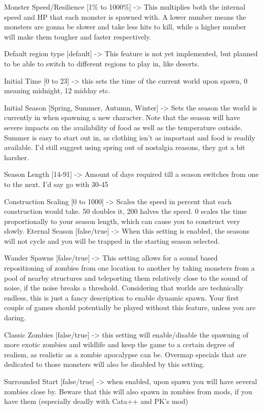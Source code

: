 \documentclass[11pt]{report}
\begin{document}
Monster Speed/Resilience [1\% to 1000\%] -> This multiplies both the internal speed and HP that each monster is spawned with. A lower number means the monsters are gonna be slower and take less hits to kill, while a higher number will make them tougher and faster respectively.

Default region type [default] -> This feature is not yet implemented, but planned to be able to switch to different regions to play in, like deserts.

Initial Time [0 to 23] -> this sets the time of the current world upon spawn, 0 meaning midnight, 12 midday etc.

Initial Season [Spring, Summer, Autumn, Winter] -> Sets the season the world is currently in when spawning a new character. Note that the season will have severe impacts on the availability of food as well as the temperature outside. Summer is easy to start out in, as clothing isn't as important and food is readily available. I'd still suggest using spring out of nostalgia reasons, they got a bit harsher.

Season Length [14-91] -> Amount of days required till a season switches from one to the next. I'd say go with 30-45

Construction Scaling [0 to 1000] -> Scales the speed in percent that each construction would take. 50 doubles it, 200 halves the speed. 0 scales the time proportionally to your season length, which can cause you to construct very slowly.
Eternal Season [false/true] -> When this setting is enabled, the seasons will not cycle and you will be trapped in the starting season selected.

Wander Spawns [false/true] -> This setting allows for a sound based repositioning of zombies from one location to another by taking monsters from a pool of nearby structures and teleporting them relatively close to the sound of noise, if the noise breaks a threshold. Considering that worlds are technically endless, this is just a fancy description to enable dynamic spawn. Your first couple of games should potentially be played without this feature, unless you are daring.

Classic Zombies [false/true] -> this setting will enable/disable the spawning of more exotic zombies and wildlife and keep the game to a certain degree of realism, as realistic as a zombie apocalypse can be. Overmap specials that are dedicated to those monsters will also be disabled by this setting.

Surrounded Start [false/true] -> when enabled, upon spawn you will have several zombies close by. Beware that this will also spawn in zombies from mods, if you have them (especially deadly with Cata++ and PK's mod)
\end{document}
